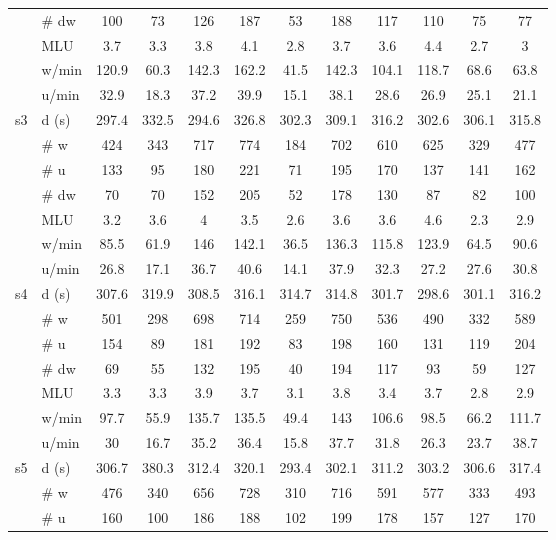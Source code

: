 \begin{screenonly}
\begin{table*}[h]
\begin{tabular*}{\hsize}{@{\extracolsep{\fill}}clcccccccccc}
    & \# dw & 100 & 73 & 126 & 187 & 53 & 188 & 117 & 110 & 75 & 77\\
    & MLU & 3.7 & 3.3 & 3.8 & 4.1 & 2.8 & 3.7 & 3.6 & 4.4 & 2.7 & 3\\
    & w/min & 120.9 & 60.3 & 142.3 & 162.2 & 41.5 & 142.3 & 104.1 & 118.7 & 68.6 & 63.8\\
    & u/min & 32.9 & 18.3 & 37.2 & 39.9 & 15.1 & 38.1 & 28.6 & 26.9 & 25.1 & 21.1\\
    \cmidrule{2-12}
    \multirow{7}{*}{s3} & d (s) & 297.4 & 332.5 & 294.6 & 326.8 & 302.3 & 309.1 & 316.2 & 302.6 & 306.1 & 315.8\\
    & \# w & 424 & 343 & 717 & 774 & 184 & 702 & 610 & 625 & 329 & 477\\
    & \# u & 133 & 95 & 180 & 221 & 71 & 195 & 170 & 137 & 141 & 162\\
    & \# dw & 70 & 70 & 152 & 205 & 52 & 178 & 130 & 87 & 82 & 100\\
    & MLU & 3.2 & 3.6 & 4 & 3.5 & 2.6 & 3.6 & 3.6 & 4.6 & 2.3 & 2.9\\
    & w/min & 85.5 & 61.9 & 146 & 142.1 & 36.5 & 136.3 & 115.8 & 123.9 & 64.5 & 90.6\\
    & u/min & 26.8 & 17.1 & 36.7 & 40.6 & 14.1 & 37.9 & 32.3 & 27.2 & 27.6 & 30.8\\
    \cmidrule{2-12}
    \multirow{7}{*}{s4} & d (s) & 307.6 & 319.9 & 308.5 & 316.1 & 314.7 & 314.8 & 301.7 & 298.6 & 301.1 & 316.2\\
    & \# w & 501 & 298 & 698 & 714 & 259 & 750 & 536 & 490 & 332 & 589\\
    & \# u & 154 & 89 & 181 & 192 & 83 & 198 & 160 & 131 & 119 & 204\\
    & \# dw & 69 & 55 & 132 & 195 & 40 & 194 & 117 & 93 & 59 & 127\\
    & MLU & 3.3 & 3.3 & 3.9 & 3.7 & 3.1 & 3.8 & 3.4 & 3.7 & 2.8 & 2.9\\
    & w/min & 97.7 & 55.9 & 135.7 & 135.5 & 49.4 & 143 & 106.6 & 98.5 & 66.2 & 111.7\\
    & u/min & 30 & 16.7 & 35.2 & 36.4 & 15.8 & 37.7 & 31.8 & 26.3 & 23.7 & 38.7\\
    \cmidrule{2-12}
    \multirow{7}{*}{s5} & d (s) & 306.7 & 380.3 & 312.4 & 320.1 & 293.4 & 302.1 & 311.2 & 303.2 & 306.6 & 317.4\\
    & \# w & 476 & 340 & 656 & 728 & 310 & 716 & 591 & 577 & 333 & 493\\
    & \# u & 160 & 100 & 186 & 188 & 102 & 199 & 178 & 157 & 127 & 170\\

\end{tabular*}
\end{table*}
\end{screenonly}
